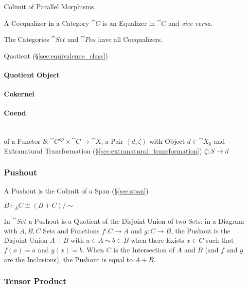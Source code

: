 Colimit of Parallel Morphisms

A Coequalizer in a Category $\cat{C}$ is an Equalizer in
$\cat{C}$ and \emph{vice versa}.

The Categories $\cat{Set}$ and $\cat{Pos}$ have all
Coequalizers.

Quotient (\S\ref{sec:equivalence_class})



\paragraph{Quotient Object}\label{sec:quotient_object}

\paragraph{Cokernel}\label{sec:cokernel}

\paragraph{Coend}\label{sec:coend}
\hfill \\

of a Functor $S : \cat{C}^{op} \times \cat{C} \rightarrow
\cat{X}$, a Pair $(d, \zeta)$ with Object $d \in \cat{X}_0$ and
Extranatural Transformation (\S\ref{sec:extranatural_transformation})
$\zeta : S \xrightarrow{..} d$



\subsubsection{Pushout}\label{sec:pushout}

A Pushout is the Colimit of a Span (\S\ref{sec:span})

$B +_A C \cong (B + C)/\sim$

In $\cat{Set}$ a Pushout is a Quotient of the Disjoint Union of two
Sets: in a Diagram with $A,B,C$ Sets and Functions $f : C \rightarrow
A$ and $g : C \rightarrow B$, the Pushout is the Disjoint Union $A +
B$ with $a \in A \sim b \in B$ when there Exists $x \in C$ such that
$f(x) = a$ and $g(x) = b$. When $C$ is the Intersection of $A$ and $B$
(and $f$ and $g$ are the Inclusions), the Pushout is equal to $A + B$.



\subsubsection{Tensor Product}\label{sec:tensor_product}

